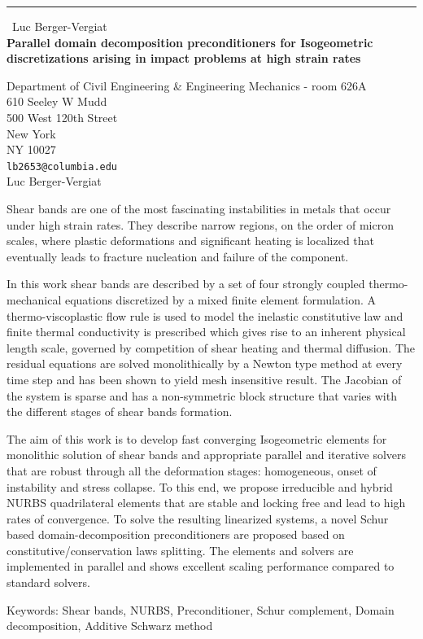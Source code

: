 \documentclass{report}
\begin{document}
\begin{center}
\rule{6in}{1pt} \
{\large Luc Berger-Vergiat \\
{\bf Parallel domain decomposition preconditioners for Isogeometric discretizations arising in impact problems at high strain rates}}

Department of Civil Engineering \& Engineering Mechanics - room 626A \\ 610 Seeley W Mudd \\ 500 West 120th Street \\ New York \\ NY 10027
\\
{\tt lb2653@columbia.edu}\\
Luc Berger-Vergiat\end{center}

Shear bands are one of the most fascinating instabilities in metals that
occur under high strain rates. They describe narrow regions, on the order
of micron scales, where plastic deformations
and significant heating is localized that eventually leads to fracture
nucleation and failure of the component.

In this work shear bands are described by a set of four strongly coupled
thermo-mechanical equations discretized by a mixed finite element
formulation. A thermo-viscoplastic flow rule is used to model the
inelastic constitutive law and finite thermal conductivity is prescribed
which gives rise to an inherent physical length scale, governed by
competition of shear heating and thermal diffusion. The residual
equations are solved monolithically by a Newton type method at every time
step and has been shown to yield mesh insensitive result. The Jacobian of
the system is sparse and has a non-symmetric block structure that varies
with the different stages of shear bands formation.

The aim of this work is to develop fast converging Isogeometric elements
for monolithic solution of shear bands and appropriate parallel and
iterative solvers that are robust through all the deformation stages:
homogeneous, onset of instability and stress collapse. To this end, we
propose irreducible and hybrid NURBS quadrilateral elements that are
stable and locking free and lead to high rates of convergence. To solve
the resulting linearized systems, a novel Schur based
domain-decomposition preconditioners are proposed based on
constitutive/conservation laws splitting. The elements and solvers are
implemented in parallel and shows excellent scaling performance compared
to standard solvers.

Keywords: Shear bands, NURBS, Preconditioner, Schur complement, Domain
decomposition, Additive Schwarz method
\end{document}
